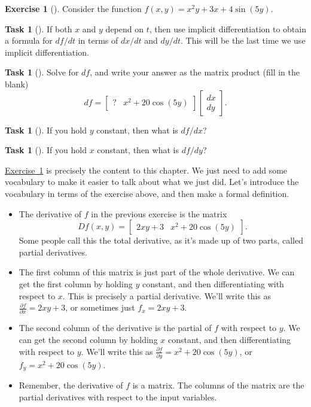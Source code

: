 \documentclass[10pt,]{book}
\theoremstyle{plain}
\theoremstyle{definition}
\theoremstyle{definition}
\theoremstyle{definition}
\theoremstyle{definition}
\newtheorem{exploration}[project]{Exercise}
\newtheorem{task}[project]{Task}
\theoremstyle{definition}
\numberwithin{equation}{section}
\newcommand{\amp}{&}
\begin{document}
\begin{exploration}[]\label{unit6_content}
Consider the function \(f(x,y) = x^2y +3x+4\sin(5y)\).%
\begin{task}[]\label{task-281}
If both \(x\) and \(y\) depend on \(t\), then use implicit differentiation to obtain a formula for \(df/dt\) in terms of \(dx/dt\) and \(dy/dt\). This will be the last time we use implicit differentiation.%
\end{task}
\begin{task}[]\label{task-282}
Solve for \(df\), and write your answer as the matrix product (fill in the blank)%
\begin{equation*}
df = \begin{bmatrix}?\amp  x^2+20\cos(5y)
\end{bmatrix} \begin{bmatrix}dx\\dy
\end{bmatrix} .
\end{equation*}
%
\end{task}
\begin{task}[]\label{task-283}
If you hold \(y\) constant, then what is \(df/dx\)?%
\end{task}
\begin{task}[]\label{task-284}
If you hold \(x\) constant, then what is \(df/dy\)?%
\end{task}
\end{exploration}
\hyperref[unit6_content]{Exercise~\ref{unit6_content}} is precisely the content to this chapter. We just need to add some vocabulary to make it easier to talk about what we just did. Let's introduce the vocabulary in terms of the exercise above, and then make a formal definition. \leavevmode%
\begin{itemize}[label=\textbullet]
\item{}The derivative of \(f\) in the previous exercise is the matrix%
\begin{equation*}
Df(x,y) = \begin{bmatrix}2xy+3\amp  
x^2+20\cos(5y)
\end{bmatrix} .
\end{equation*}
Some people call this the total derivative, as it's made up of two parts, called partial derivatives.%
\item{}The first column of this matrix is just part of the whole derivative. We can get the first column by holding \(y\) constant, and then differentiating with respect to \(x\). This is precisely a partial derivative.  We'll write this as \(\frac{\partial f}{\partial x} = 2xy+3\), or sometimes just \(f_x = 2xy+3\).%
\item{}The second column of the derivative is the partial of \(f\) with respect to \(y\). We can get the second column by holding \(x\) constant, and then differentiating with respect to \(y\). We'll write this as \(\frac{\partial f}{\partial y} = x^2+20\cos(5y)\), or \(f_y = x^2+20\cos(5y)\).%
\item{}Remember, the derivative of \(f\) is a matrix. The columns of the matrix are the partial derivatives with respect to the input variables.%
\end{itemize}
\end{document}
